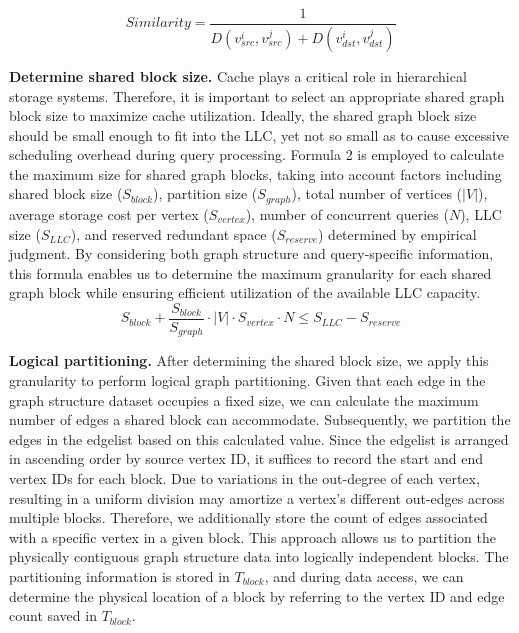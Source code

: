 \documentclass[10pt,journal,compsoc]{IEEEtran}
\begin{document}
\begin{equation}
{Similarity} = \frac{1}{{D}(v_{src}^i,v_{src}^j) + {D}(v_{dst}^i,v_{dst}^j)}
\end{equation}


{\bf{Determine shared block size.}} Cache plays a critical role in hierarchical storage systems. Therefore, it is important to select an appropriate shared graph block size to maximize cache utilization. Ideally, the shared graph block size should be small enough to fit into the LLC, yet not so small as to cause excessive scheduling overhead during query processing. Formula 2 is employed to calculate the maximum size for shared graph blocks, taking into account factors including shared block size ($S_{block}$), partition size ($S_{graph}$), total number of vertices ($|V|$), average storage cost per vertex ($S_{vertex}$), number of concurrent queries ($N$), LLC size ($S_{LLC}$), and reserved redundant space ($S_{reserve}$) determined by empirical judgment. By considering both graph structure and query-specific information, this formula enables us to determine the maximum granularity for each shared graph block while ensuring efficient utilization of the available LLC capacity.
\begin{equation}
    S_{block} + \frac{S_{block}}{S_{graph}} \cdot \lvert V \rvert \cdot S_{vertex} \cdot N \leq S_{LLC} - S_{reserve}
    \end{equation}

{\bf{Logical partitioning.}} After determining the shared block size, we apply this granularity to perform logical graph partitioning. Given that each edge in the graph structure dataset occupies a fixed size, we can calculate the maximum number of edges a shared block can accommodate. Subsequently, we partition the edges in the edgelist based on this calculated value. Since the edgelist is arranged in ascending order by source vertex ID, it suffices to record the start and end vertex IDs for each block. Due to variations in the out-degree of each vertex, resulting in a uniform division may amortize a vertex's different out-edges across multiple blocks. Therefore, we additionally store the count of edges associated with a specific vertex in a given block. This approach allows us to partition the physically contiguous graph structure data into logically independent blocks. The partitioning information is stored in $T_{block}$, and during data access, we can determine the physical location of a block by referring to the vertex ID and edge count saved in $T_{block}$.
\end{document}
